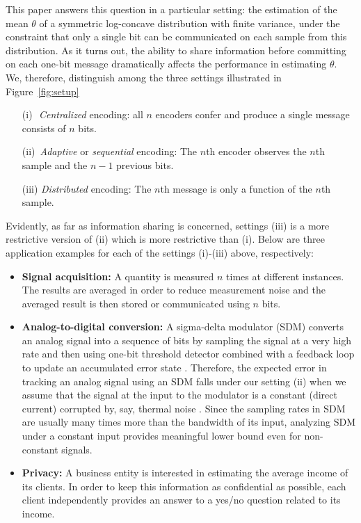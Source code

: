 \documentclass[letterpaper, 11pt]{IEEEtran}      %
\begin{document}
This paper answers this question in a particular setting: the estimation of the mean $\theta$ of a symmetric log-concave distribution with finite variance, under the constraint that only a single bit can be communicated on each sample from this distribution. As it turns out, the ability to share information before committing on each one-bit message dramatically affects the performance in estimating $\theta$. We, therefore, distinguish among the three settings illustrated in Figure~\ref{fig:setup}
\begin{itemize}
 \item[(i)\,\,] \emph{Centralized} encoding: all $n$ encoders confer and produce a single message consists of $n$ bits.
 \item[(ii)\,] \emph{Adaptive} or \emph{sequential} encoding: The $n$th encoder observes the $n$th sample and the $n-1$ previous bits.
 \item[(iii)] \emph{Distributed} encoding: The $n$th message is only a function of the $n$th sample.
 \end{itemize}
Evidently, as far as information sharing is concerned, settings (iii) is a more restrictive version of (ii) which is more restrictive than (i). Below are three application examples for each of the settings (i)-(iii) above, respectively:
\begin{itemize}
\item {\bf Signal acquisition:} A quantity is measured $n$ times at different instances. The results are averaged in order to reduce measurement noise and the averaged result is then stored or communicated using $n$ bits. 
\item {\bf Analog-to-digital conversion:} A sigma-delta modulator (SDM) converts an analog signal into a sequence of bits by sampling the signal at a very high rate and then using one-bit threshold detector combined with a feedback loop to update an accumulated error state \cite{1092194}. Therefore, the expected error in tracking an analog signal using an SDM falls under our setting (ii) when we assume that the signal at the input to the modulator is a constant (direct current) corrupted by, say, thermal noise \cite{53738}. Since the sampling rates in SDM are usually many times more than the bandwidth of its input, analyzing SDM under a constant input provides meaningful lower bound even for non-constant signals.
\item {\bf Privacy:} A business entity is interested in estimating the average income of its clients. In order to keep this information as confidential as possible, each client independently provides an answer to a yes/no question related to its income.
\end{itemize}
\end{document}
